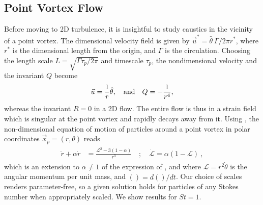 \subsection{Point Vortex Flow}\label{pv}
Before moving to 2D turbulence, it is insightful to study caustics in the vicinity of a point vortex. 
The dimensional velocity field is given by $\vec{u}^* = \hat{\theta} ~\Gamma /2\pi r^*$, where $r^*$ is the dimensional length from the origin, and $\Gamma$ is the circulation. Choosing the length scale $L  = \sqrt{\Gamma \tau_p/2\pi}$ \cite{ravichandran2015}  and timescale $\tau_p$, the nondimensional velocity and the invariant $Q$ become
\begin{equation}
    \vec{u} = \frac{1}{r}\hat{\theta}, \quad {\rm and} \quad Q = -\frac{1}{r^4},
\end{equation} 
whereas the invariant $R=0$ in a 2D flow. The entire flow is thus in a strain field which is singular at the point vortex and rapidly decays away from it.
Using , the non-dimensional equation of motion of particles around a point vortex in polar coordinates $\vec{x}_p = (r,\theta)$ reads
\begin{align}
  \label{nd_ptvrtx}
  \begin{split}
      \ddot{r} + \alpha \dot{r} &= \frac{\mathscr{L}^2 - 3(1-\alpha)}{r^3} \quad 
 ; \quad \dot{\mathscr{L}} = \alpha(1 - \mathscr{L}) \ , 
  \end{split}
\end{align}
 which is an extension to $\alpha \ne 1$ of the expression of \cite{ravichandran2015}, and where $\mathscr{L} = r^2 \dot{\theta}$ is the angular momentum per unit mass, and $\dot{()} = d()/dt$. Our choice of scales renders  parameter-free, so a given solution holds for particles of any Stokes number when appropriately scaled. We show results for $St=1$. 


